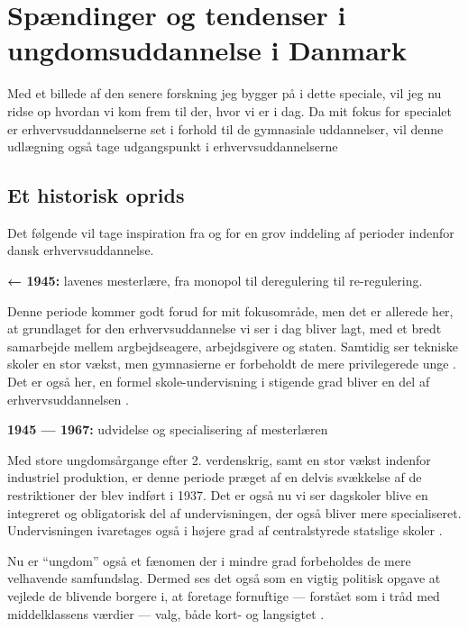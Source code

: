 \chapter{Spændinger og tendenser i ungdomsuddannelse i Danmark}

Med et billede af den senere forskning jeg bygger på i dette speciale, vil jeg nu ridse op hvordan vi kom frem til der, hvor vi er i dag.
Da mit fokus for specialet er erhvervsuddannelserne set i forhold til de gymnasiale uddannelser, vil denne udlægning også tage udgangspunkt i erhvervsuddannelserne

\section{Et historisk oprids}

Det følgende vil tage inspiration fra \cite{bondergaardHistoricalEmergenceKey2014} og \cite{juulDiskurserOmUngdom2013} for en grov inddeling af perioder indenfor dansk erhvervsuddannelse.

\textbf{← 1945:} lavenes mesterlære, fra monopol til deregulering til re-regulering.

Denne periode kommer  godt forud for mit fokusområde, men det er allerede her, at grundlaget for den erhvervsuddannelse vi ser i dag bliver lagt, med et bredt samarbejde mellem argbejdseagere, arbejdsgivere og staten.
Samtidig ser tekniske skoler en stor vækst, men gymnasierne er forbeholdt de mere privilegerede unge \autocite[s. 9]{bondergaardHistoricalEmergenceKey2014}.
Det er også her, en formel skole-undervisning i stigende grad bliver en del af erhvervsuddannelsen \autocite[s. 15ff]{bondergaardHistoricalEmergenceKey2014}. 

\textbf{1945 — 1967:} udvidelse og specialisering af mesterlæren

Med store ungdomsårgange efter 2. verdenskrig, samt en stor vækst indenfor industriel produktion, er denne periode præget af en delvis svækkelse af de restriktioner der blev indført i 1937.
Det er også nu vi ser dagskoler blive en integreret og obligatorisk del af undervisningen, der også bliver mere specialiseret.
Undervisningen ivaretages også i højere grad af centralstyrede statslige skoler \autocite[s. 35]{bondergaardHistoricalEmergenceKey2014}.

Nu er “ungdom” også et fænomen der i mindre grad forbeholdes de mere velhavende samfundslag.
Dermed ses det også som en vigtig politisk opgave at vejlede de blivende borgere i, at foretage fornuftige — forstået som i tråd med middelklassens værdier — valg, både kort- og langsigtet \autocite[s. 13ff]{juulDiskurserOmUngdom2013}.

